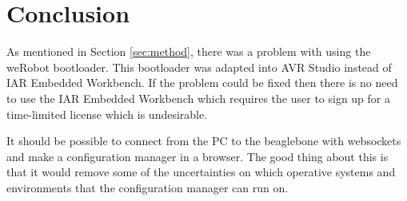 \section{Conclusion}\label{sec:conclusion}
As mentioned in Section \ref{sec:method}, there was a problem with using the weRobot bootloader. This bootloader was adapted into AVR Studio instead of IAR Embedded Workbench. If the problem could be fixed then there is no need to use the IAR Embedded Workbench which requires the user to sign up for a time-limited license which is undesirable.

It should be possible to connect from the PC to the beaglebone with websockets and make a configuration manager in a browser. The good thing about this is that it would remove some of the uncertainties on which operative systems and environments that the configuration manager can run on. 



